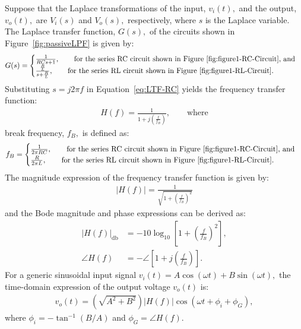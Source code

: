  Suppose that the Laplace transformations of the input, $v_i(t),$ and the output, $v_o(t),$ are $V_i(s)$ and $V_o(s),$ respectively, where $s$ is the Laplace variable. The Laplace transfer function, $G(s),$ of the circuits shown in Figure~\ref{fig:passiveLPF} is given by: %
%
 \begin{align}
   G(s) = 
   \begin{cases}
     \frac{1}{RCs + 1},\qquad\text{for the series RC circuit  shown in Figure~\ref{fig:figure1-RC-Circuit}, and}\\
     \frac{\frac{R}{L}}{s + \frac{R}{L}}, \qquad\text{for the series RL circuit  shown in Figure~\ref{fig:figure1-RL-Circuit}.}
   \end{cases}
  \label{eq:LTF-RC}
\end{align}
%
Substituting $s=j2\pi f$ in Equation~\eqref{eq:LTF-RC} yields the frequency transfer function: %
%
%
\begin{align}
  H(f) = \frac{1}{1 + j\left(\frac{f}{f_B}\right)},\qquad\text{where}
  \label{eq:FTF-RC}
\end{align}
%
break frequency, $f_B,$ is defined as: 
\begin{align*}
  f_B = 
\begin{cases}
  \frac{1}{2\pi RC}, \qquad\text{for the series RC circuit  shown in Figure~\ref{fig:figure1-RC-Circuit}, and}\\
  \frac{R}{2\pi L}, \qquad\text{for the series RL circuit  shown in Figure~\ref{fig:figure1-RL-Circuit}.}
\end{cases}  
\end{align*}
%
The magnitude expression of the frequency transfer function is given by: %
%
  \begin{align}
    \label{eq:RC-Mag}
    \left | H(f) \right | = \frac{1}{\sqrt{1+\left(\frac{f}{f_B}\right)^2}}
  \end{align}
%
and the Bode magnitude and phase expressions can be derived as: 
%
\begin{subequations}
  \label{eq:BodeRC}
  \begin{align}
    \label{eq:BodeFirstOrder-Mag}
    \left | H(f) \right |_{\si{\decibel}} &= -10\log_{10}\left[1+\left(\frac{f}{f_B}\right)^2\right],\\
            \label{eq:BodeFirstOrder-Phase}
    \angle{H(f)} & = -\angle{\left[1+j\left(\frac{f}{f_B}\right)\right]}.
  \end{align}
\end{subequations}
%
For a generic sinusoidal input signal $v_i(t) = A\cos(\omega t) + B\sin(\omega t),$ the time-domain expression of the output voltage $v_o(t)$ is: %
%
\begin{align}
  v_o(t) = \left(\sqrt{A^2+B^2}\right)\left | H(f)\right | \cos\left(\omega t + \phi_i+\phi_G\right),
  \label{eq:LPF-Out}
\end{align}
%
where $\phi_i = -\tan^{-1}(B/A)$ and $\phi_G = \angle{H(f)}.$


